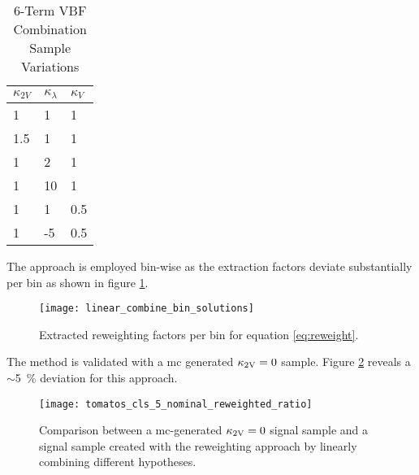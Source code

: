 \begin{table}
    \centering
    \caption{6-Term VBF Combination Sample Variations}
    \label{tab:vbf_hh_6term_varlist}
    \begin{tabular}{ |l|l|l| }
        \hline
        \textbf {$\kappa_{2V}$} & \textbf {$\kappa_\lambda$} & \textbf {$\kappa_V$} \\
        \hline
        1                       & 1                          & 1                    \\
        1.5                     & 1                          & 1                    \\
        1                       & 2                          & 1                    \\
        1                       & 10                         & 1                    \\
        1                       & 1                          & 0.5                  \\
        1                       & -5                         & 0.5                  \\
        \hline
    \end{tabular}
\end{table}
The approach is employed bin-wise as the extraction factors deviate substantially per bin as shown in figure \ref{fig:linear_combine_bin_solutions}.
\begin{figure}
    \centering
    \texttt{[image: linear\_combine\_bin\_solutions]}
    \caption[]{Extracted reweighting factors per bin for equation \ref{eq:reweight}.}
    \label{fig:linear_combine_bin_solutions}
\end{figure}
The method is validated with a mc generated $\kappa_{\text{2V}}=0$ sample. Figure \ref{fig:tomatos_cls_5_nominal_reweighted_ratio} reveals a $\sim$\qty[]{5}{\percent} deviation for this approach. 
\begin{figure}
    \centering
    \texttt{[image: tomatos\_cls\_5\_nominal\_reweighted\_ratio]}
    \caption[]{Comparison between a \ac{mc}-generated $\kappa_{\text{2V}}=0$ signal sample and a signal sample created with the reweighting approach by linearly combining different \ktwov hypotheses. }
    \label{fig:tomatos_cls_5_nominal_reweighted_ratio}
\end{figure}






